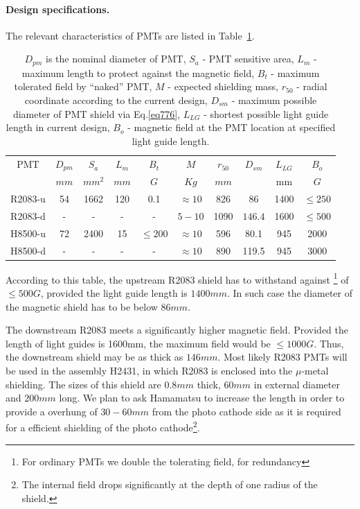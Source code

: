 \documentclass[12pt]{article}
\begin{document}
\paragraph{Design specifications.}
The relevant characteristics of PMTs are listed in Table~\ref{descon}.
\begin{table}[htbp]
\begin{center}
\begin{tabular}{|c|c|c|c|c|c|c|c|c|c|}  \hline
PMT         &$D_{pm}$& $S_a$  & $L_{m}$  &$B_{t}$  & $M$       &$r_{50}$&$D_{sm}$&$L_{LG}$& $B_{o}$   \\
            &$mm$     & $mm^2$ & $mm$     &$G$     & $Kg$      & $mm$   &        &  mm    & $G$     \\ \hline
%
R2083-u     &54       &1662    &120       &0.1      & $\approx10$    & 826    &  86  & 1400   & $\leq250$      \\
R2083-d     &-        &  -     & -        &  -      & $5-10$    & 1090   & $146.4$  & 1600   & $\leq500$     \\ \hline
H8500-u     &72       &2400    &15        &$\leq200$  &$\approx10$&  596   &  80.1  & 945    & 2000     \\
H8500-d     & -       &  -     & -        &  -       &$\approx10$& 890    & 119.5  & 945    & 3000     \\ \hline
\end{tabular}
\end{center}
\caption{
$D_{pm}$ is the nominal  diameter of PMT,
$S_a$ - PMT sensitive area,
$L_{m}$ - maximum length to protect against the magnetic field,
$B_{t}$ - maximum tolerated field by ``naked'' PMT,
$M$       - expected  shielding mass,
$r_{50}$  - radial coordinate according to the current design,
$D_{sm}$  - maximum possible diameter of PMT shield via  Eq.\ref{eq776},
$L_{LG}$  - shortest possible light guide length in current design,
$B_{o}$   - magnetic field at the PMT location at specified light guide length. 
\label{descon} }
\end{table}
%
According to this table, the upstream R2083 shield has to withstand 
against
\footnote{For ordinary PMTs we double the tolerating field, for redundancy} 
of $\leq 500G$, provided the light guide length is $1400mm$. 
In such case the diameter of the magnetic shield has to be below $86mm$.

The downstream R2083 meets a significantly higher  magnetic  field.
Provided the  length of  light guides  is 1600mm, the maximum field would
be $\leq 1000G$. Thus, the downstream  shield may be as thick as   $146mm$.
Most likely  R2083 PMTs will be used in the assembly H2431, in which R2083 is 
enclosed into the $\mu$-metal shielding. The sizes of this shield are
$0.8mm$ thick, $60mm$ in external diameter and $200mm$ long.
We plan to ask Hamamatsu to increase  the  length  in order to provide  a overhung 
of $30-60mm$ from  the photo cathode side as it is required for a 
efficient shielding of the photo cathode\footnote{The internal field 
drops significantly at the depth of one radius of the shield.}.
\end{document}
